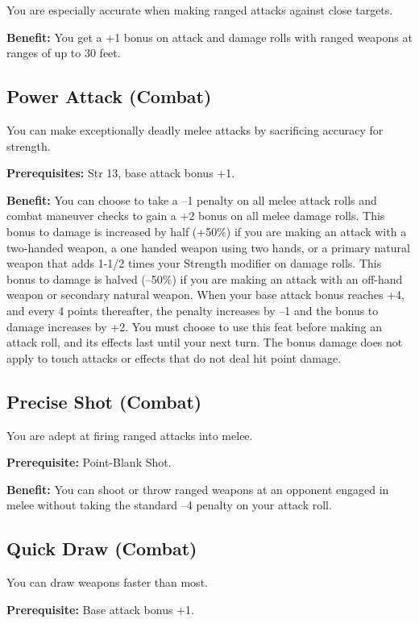 				
You are especially accurate when making ranged attacks against close targets.
				
\textbf{Benefit:} You get a +1 bonus on attack and damage rolls with ranged weapons at ranges of up to 30 feet.
				
\subsection{Power Attack (Combat)}

				
You can make exceptionally deadly melee attacks by sacrificing accuracy for strength.
				
\textbf{Prerequisites:} Str 13, base attack bonus +1.
				
\textbf{Benefit:} You can choose to take a --1 penalty on all melee attack rolls and combat maneuver checks to gain a +2 bonus on all melee damage rolls. This bonus to damage is increased by half (+50\%) if you are making an attack with a two-handed weapon, a one handed weapon using two hands, or a primary natural weapon that adds 1-1/2 times your Strength modifier on damage rolls. This bonus to damage is halved (--50\%) if you are making an attack with an off-hand weapon or secondary natural weapon. When your base attack bonus reaches +4, and every 4 points thereafter, the penalty increases by --1 and the bonus to damage increases by +2. You must choose to use this feat before making an attack roll, and its effects last until your next turn. The bonus damage does not apply to touch attacks or effects that do not deal hit point damage.
				
\subsection{Precise Shot (Combat)}

				
You are adept at firing ranged attacks into melee.
				
\textbf{Prerequisite:} Point-Blank Shot.
				
\textbf{Benefit:} You can shoot or throw ranged weapons at an opponent engaged in melee without taking the standard --4 penalty on your attack roll.
				
\subsection{Quick Draw (Combat)}

				
You can draw weapons faster than most.
				
\textbf{Prerequisite:} Base attack bonus +1.
				

